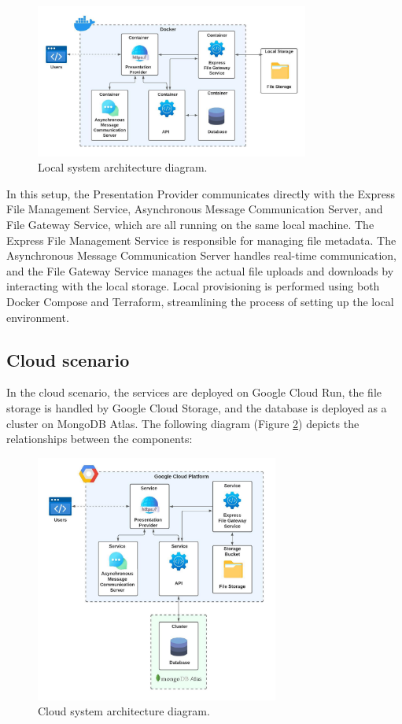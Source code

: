 \documentclass[a4paper,fleqn]{cas-sc}
\begin{document}
\begin{figure}[htb]
\centering
\includegraphics[width=9cm]{LocalArch.jpeg}
\caption{Local system architecture diagram.}
\label{fig:architectureLocal}
\end{figure}

In this setup, the Presentation Provider communicates directly with the Express File Management Service, Asynchronous Message Communication Server, and File Gateway Service, which are all running on the same local machine. The Express File Management Service is responsible for managing file metadata. The Asynchronous Message Communication Server handles real-time communication, and the File Gateway Service manages the actual file uploads and downloads by interacting with the local storage. Local provisioning is performed using both Docker Compose and Terraform, streamlining the process of setting up the local environment.

\subsection{Cloud scenario}
In the cloud scenario, the services are deployed on Google Cloud Run, the file storage is handled by Google Cloud Storage, and the database is deployed as a cluster on MongoDB Atlas. The following diagram (Figure \ref{fig:architectureCloud}) depicts the relationships between the components:

\begin{figure}[htb]
\centering
\includegraphics[width=8cm]{CloudArch.jpeg}
\caption{Cloud system architecture diagram.}
\label{fig:architectureCloud}
\end{figure}
\end{document}
